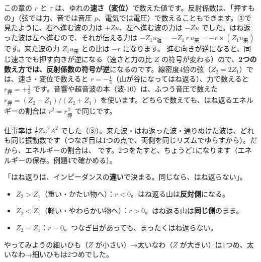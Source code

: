 \label{ph:波-7:fugou}この章の $r$ と $\tau$ は、ゆれの\textbf{速さ（変位）}で数えた値です。反射係数は、「押すもの」（弦では力、音では音圧 $p$、電気では電圧）で数えることもできます。③で見たように、右へ進む波の力は $+Zu$、左へ進む波の力は $-Zu$ でした。はね返った波は左へ進むので、それが伝える力は $-Z_1u_{\text{返}}=-Z_1\,r\,u_{\text{来}}=-r\times(Z_1u_{\text{来}})$ です。来た波の力 $Z_1u_{\text{来}}$ との比は $-r$ になります。
進む向きが逆になると、同じ速さでも押す向きが逆になる（速さと力の比 $Z$ の符号が変わる）ので、\textbf{2つの数え方では、反射係数の符号が逆}になるのです。線密度4倍の弦（$Z_2=2Z_1$）では、速さ・変位で数えると $r=-\tfrac13$（山が谷になってはね返る）、力で数えると $r_{\text{押}}=+\tfrac13$ です。音響や超音波の本（波-10）は、ふつう音圧で数えた $r_{\text{押}}=(Z_2-Z_1)/(Z_2+Z_1)$ を使います。どちらで数えても、はね返るエネルギーの割合は $r^2=r_{\text{押}}^{\,2}$ で同じです。

仕事率は $\tfrac12Z\omega^2A^2$ でした（③）。来た波・はね返った波・通りぬけた波は、どれも同じ振動数です（つなぎ目は1つの点で、両側を同じリズムでゆらすから）。だから、エネルギーの割合は、
\label{ph:波-7:wariai}です。2つをたすと、ちょうど1になります（エネルギーの保存。例題4で確かめる）。

\begin{phyomi}[$r=\dfrac{Z_1-Z_2}{Z_1+Z_2}$]
「はね返りは、インピーダンスの\textbf{違い}で決まる。同じなら、はね返らない」。
\begin{itemize}[leftmargin=1.2\zw, itemsep=1pt, topsep=1pt, label={\color{bkTheme}●}]
\item $Z_2>Z_1$（重い・かたい物へ）：$r<0$。はね返る山は\textbf{反対側}になる。
\item $Z_2<Z_1$（軽い・やわらかい物へ）：$r>0$。はね返る山は\textbf{同じ側}のまま。
\item $Z_2=Z_1$：$r=0$。つなぎ目があっても、まったくはね返らない。
\end{itemize}
やってみようの細いひも（$Z$ が小さい）→太いなわ（$Z$ が大きい）は1つめ、太いなわ→細いひもは2つめでした。
\end{phyomi}

